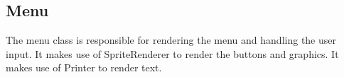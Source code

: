 \subsection{Menu}

The menu class is responsible for rendering the menu and handling the user input.
It makes use of SpriteRenderer to render the buttons and graphics.
It makes use of Printer to render text.